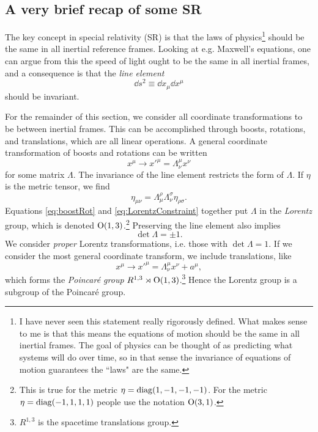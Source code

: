 \subsection{A very brief recap of some SR}

The key concept in special relativity (SR) is that the laws of
physics\footnote{I have never seen this statement really rigorously defined.
What makes sense to me is that this means the equations of motion should be the
same in all inertial frames. The goal of physics can be thought of as predicting
what systems will do over time, so in that sense the invariance of equations of
motion guarantees the ``laws" are the same.} 
should be the same in all inertial reference frames. Looking at e.g. Maxwell's
equations, one can argue from this the speed of light ought to be the same in
all inertial frames, and a consequence is that the {\it line element}
\begin{equation}
\dd{s}^2\equiv\dd{x}_\mu\dd{x}^\mu
\end{equation}
should be invariant.

For the remainder of this section, we consider all coordinate transformations to
be between inertial frames. This can be accomplished through boosts, rotations, and
translations, which are all linear operations. A general coordinate
transformation of boosts and rotations can be written
\begin{equation}\label{eq:boostRot}
x^\mu\to x'^{\mu} = \Lambda_\nu^\mu x^\nu
\end{equation}
for some matrix $\Lambda$. The invariance of the line element restricts the form
of $\Lambda$. If $\eta$ is the metric tensor, we find 
\begin{equation}\label{eq:LorentzConstraint}
\eta_{\mu\nu}=\Lambda_\mu^\rho\Lambda_\nu^\sigma\eta_{\rho\sigma}.
\end{equation}
Equations \eqref{eq:boostRot} and \eqref{eq:LorentzConstraint} together put
$\Lambda$ in the {\it Lorentz} group, which is
denoted $\operatorname{\text{O}}(1,3)$.\footnote{This is true for the metric
$\eta=\mathop{\mathrm{diag}}(1,-1,-1,-1)$. For the metric $\eta=\mathop{\mathrm{diag}}(-1,1,1,1)$ people use the
notation $\operatorname{\text{O}}(3,1)$.} Preserving the line element also implies
\begin{equation}
\det\Lambda=\pm1.
\end{equation}
We consider {\it proper} Lorentz
transformations, i.e. those with $\det\Lambda=1$. If we consider the most
general coordinate transform, we include translations, like
\begin{equation}\label{eq:boostRot}
x^\mu\to x'^{\mu} = \Lambda_\nu^\mu x^\nu + a^\mu,
\end{equation}
which forms the {\it Poincar\'e group} 
$R^{1,3}\rtimes\operatorname{\text{O}}(1,3)$.\footnote{$R^{1,3}$ is the spacetime translations
group.} 
Hence the Lorentz group is a subgroup of the Poincar\'e group.


